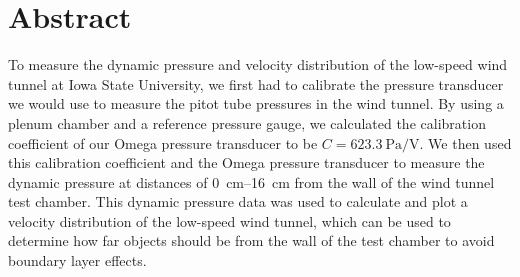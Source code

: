 \thispagestyle{plain} %



\chapter*{Abstract} %
To measure the dynamic pressure and velocity distribution of the low-speed wind tunnel at Iowa State University, we first had to calibrate the pressure transducer we would use to measure the pitot tube pressures in the wind tunnel. By using a plenum chamber and a reference pressure gauge, we calculated the calibration coefficient of our Omega pressure transducer to be $C = \qty{623.3}{\pascal\per\volt}$. We then used this calibration coefficient and the Omega pressure transducer to measure the dynamic pressure at distances of \qtyrange{0}{16}{\centi\meter} from the wall of the wind tunnel test chamber. This dynamic pressure data was used to calculate and plot a velocity distribution of the low-speed wind tunnel, which can be used to determine how far objects should be from the wall of the test chamber to avoid boundary layer effects.



